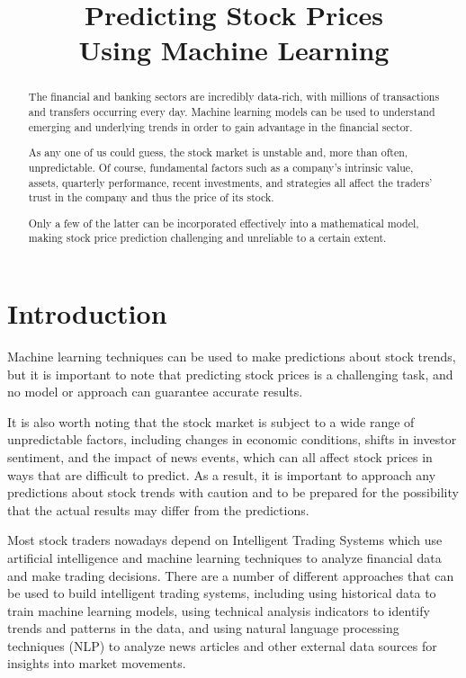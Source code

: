 \documentclass[conference,compsoc]{IEEEtran}
\begin{document}
\title{Predicting Stock Prices \\ Using Machine Learning}

\author{
}

\maketitle

\begin{abstract}
The financial and banking sectors are incredibly data-rich, with millions of transactions and transfers occurring every day.
%
Machine learning models can be used to understand emerging and underlying trends in order to gain advantage in the financial sector. 

As any one of us could guess, the stock market is unstable and, more than often, unpredictable.
%
Of course, fundamental factors such as a company’s intrinsic value, assets, quarterly performance, recent investments, and strategies all affect the traders’ trust in the company and thus the price of its stock. 

Only a few of the latter can be incorporated effectively into a mathematical model, making stock price prediction challenging and unreliable to a certain extent.
\end{abstract}

\IEEEpeerreviewmaketitle

\section{Introduction}

Machine learning techniques can be used to make predictions about stock trends, but it is important to note that predicting stock prices is a challenging task, and no model or approach can guarantee accurate results.

It is also worth noting that the stock market is subject to a wide range of unpredictable factors, including changes in economic conditions, shifts in investor sentiment, and the impact of news events, which can all affect stock prices in ways that are difficult to predict. 
%
As a result, it is important to approach any predictions about stock trends with caution and to be prepared for the possibility that the actual results may differ from the predictions.

Most stock traders nowadays depend on Intelligent Trading Systems which use artificial intelligence and machine learning techniques to analyze financial data and make trading decisions.
%
There are a number of different approaches that can be used to build intelligent trading systems, including using historical data to train machine learning models, using technical analysis indicators to identify trends and patterns in the data, and using natural language processing techniques (NLP) to analyze news articles and other external data sources for insights into market movements.
\end{document}
